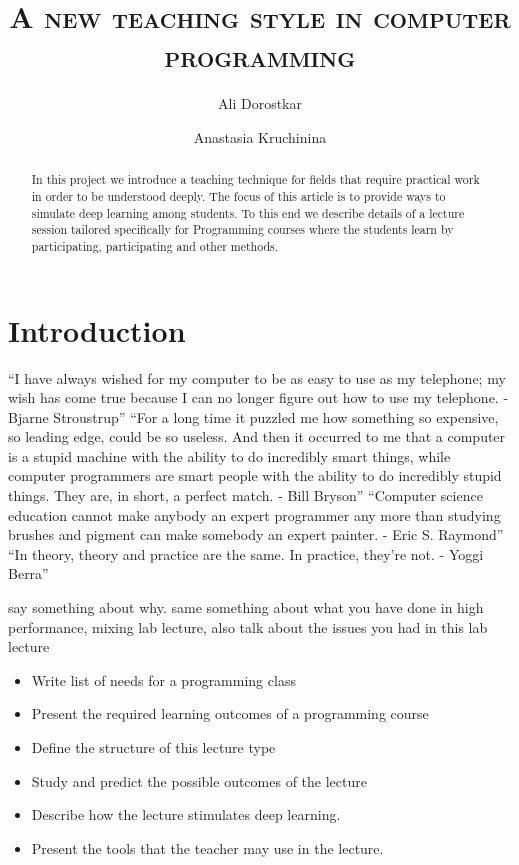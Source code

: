 \documentclass{article}
\author{Ali Dorostkar \and Anastasia Kruchinina}
\title{\textsc{A new teaching style in computer programming}}
\date{}
\begin{document}
\maketitle \begin{abstract}
In this project we introduce a teaching technique for fields that require
practical work in order to be understood deeply. The focus of this article is 
to provide ways to simulate deep learning among students. To this end we describe 
details of a lecture session tailored specifically for Programming courses
where the students learn by participating, participating and other methods.
\end{abstract}

\section{Introduction} %
\label{sec:introduction}

``I have always wished for my computer to be as easy to use as my telephone;
my wish has come true because I can no longer figure out how to use my
telephone. - Bjarne Stroustrup''
\newline  
\newline
``For a long time it puzzled me how something so expensive, so leading edge,
could be so useless. And then it occurred to me that a computer is a stupid
machine with the ability to do incredibly smart things, while computer
programmers are smart people with the ability to do incredibly stupid things.
They are, in short, a perfect match. - Bill Bryson''
\newline 
\newline
``Computer science education cannot make anybody an expert programmer any
more than studying brushes and pigment can make somebody an expert painter. -
Eric S. Raymond'' 
\newline
\newline
``In theory, theory and practice are the same. In practice,
they’re not. - Yoggi Berra'' 

say something about why.
same something about what you have done in high performance, mixing lab lecture,
also talk about the issues you had in this lab lecture
\begin{itemize}
	\item Write list of needs for a programming class
	\item Present the required learning outcomes of a programming course
	\item Define the structure of this lecture type
	\item Study and predict the possible outcomes of the lecture
	\item Describe how the lecture stimulates deep learning.
	\item Present the tools that the teacher may use in the lecture.
\end{itemize}
\end{document}
